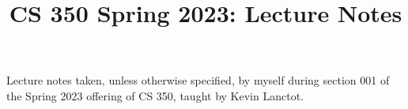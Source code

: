 \documentclass[notes,minted]{agony}
\title{CS 350 Spring 2023: Lecture Notes}
\begin{document}
\renewcommand{\contentsname}{CS 350 Spring 2023:\\{\huge Lecture Notes}}
\thispagestyle{firstpage}
\tableofcontents

Lecture notes taken, unless otherwise specified,
by myself during section 001 of the Spring 2023 offering of CS 350,
taught by Kevin Lanctot.

\begin{multicols*}{2}
  \listoflecture
\end{multicols*}



\printindex
\end{document}
